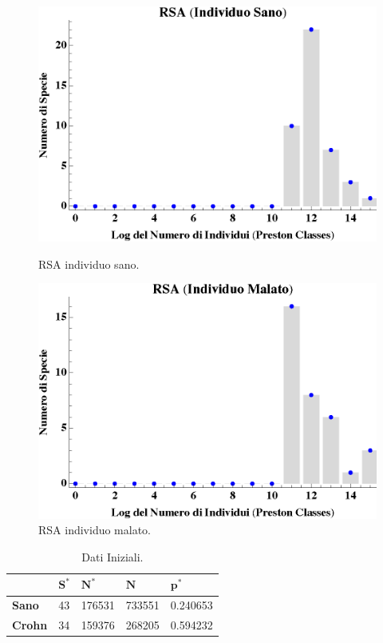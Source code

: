 \begin{figure}[H]
  \centering
  \begin{minipage}[b]{0.45\textwidth}
    \includegraphics[width=\textwidth]{Figure/RSAH.eps}
    \caption{RSA individuo sano.}
    \label{fig:RSAH}
  \end{minipage}
  \hfill
  \begin{minipage}[b]{0.45\textwidth}
    \includegraphics[width=\textwidth]{Figure/RSAC.eps}
    \caption{RSA individuo malato.}
    \label{fig:RSAC}
  \end{minipage}
\end{figure}

\begin{table}[H]
\centering
\begin{tabular}{l|l|l|l|l|}
\cline{2-5}
                                     & $\mathbf{S^*}$ & $\mathbf{N^*}$ & $\mathbf{N}$ & $\mathbf{p^*}$ \\ \hline
\multicolumn{1}{|l|}{\textbf{Sano}}  & 43                & 176531               & 733551           & 0.240653    \\ \hline
\multicolumn{1}{|l|}{\textbf{Crohn}} & 34                & 159376               & 268205           & 0.594232    \\ \hline
\end{tabular}
\caption{Dati Iniziali.}
\label{Tab:dati}
\end{table}

